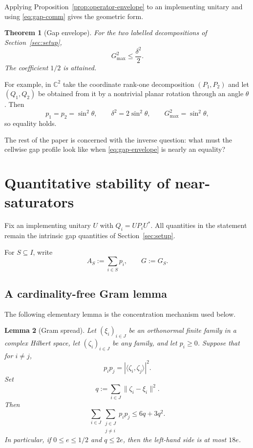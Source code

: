 \documentclass[11pt]{article}
\newtheorem{theorem}{Theorem}[section]
\newtheorem{lemma}[theorem]{Lemma}
\newcommand{\C}{\mathbb{C}}
\newcommand{\gmax}{G_{\max}}
\newcommand{\dd}{\delta}
\begin{document}
Applying Proposition~\ref{prop:operator-envelope} to an implementing unitary
and using \eqref{eq:gap-comm} gives the geometric form.

\begin{theorem}[Gap envelope]\label{thm:envelope}
For the two labelled decompositions of Section~\ref{sec:setup},
\begin{equation}\label{eq:gap-envelope}
  \boxed{\gmax^2\le\frac{\dd^2}{2}}.
\end{equation}
The coefficient $1/2$ is attained.
\end{theorem}

For example, in $\C^2$ take the coordinate rank-one decomposition
$(P_1,P_2)$ and let $(Q_1,Q_2)$ be obtained from it by a nontrivial planar
rotation through an angle $\theta$.  Then
\[
  p_1=p_2=\sin^2\theta,\qquad
  \dd^2=2\sin^2\theta,\qquad
  \gmax^2=\sin^2\theta,
\]
so equality holds.

The rest of the paper is concerned with the inverse question: what must the
cellwise gap profile look like when \eqref{eq:gap-envelope} is nearly an
equality?

\section{Quantitative stability of near-saturators}\label{sec:stability}

Fix an implementing unitary $U$ with $Q_i=UP_iU^*$.  All quantities in the
statement remain the intrinsic gap quantities of Section~\ref{sec:setup}.

For $S\subseteq I$, write
\[
  A_S:=\sum_{i\in S}p_i,
  \qquad
  G:=G_S.
\]

\subsection{A cardinality-free Gram lemma}

The following elementary lemma is the concentration mechanism used below.

\begin{lemma}[Gram spread]\label{lem:gram}
Let $(\xi_i)_{i\in J}$ be an orthonormal finite family in a complex Hilbert
space, let $(\zeta_i)_{i\in J}$ be any family, and let $p_i\ge0$.  Suppose
that for $i\ne j$,
\[
  p_ip_j=|\langle\zeta_i,\zeta_j\rangle|^2.
\]
Set
\[
  q:=\sum_{i\in J}\|\zeta_i-\xi_i\|^2.
\]
Then
\begin{equation}\label{eq:gram-spread-general}
  \sum_{i\in J}\sum_{\substack{j\in J\\j\ne i}}p_ip_j
  \le 6q+3q^2.
\end{equation}
In particular, if $0\le e\le1/2$ and $q\le2e$, then the left-hand side is
at most $18e$.
\end{lemma}
\end{document}
